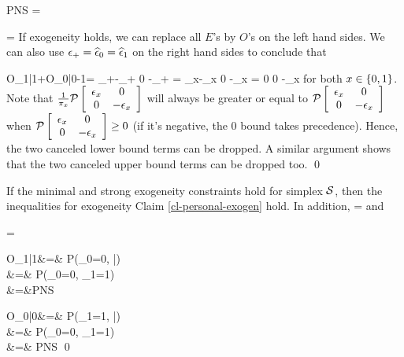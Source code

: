 \beq
PNS =
\eeq

\beq
\left[
\begin{array}{c}
E_{1|1}
\\
\\
E_{0|0}
\\
\\
O_{1,1}+ O_{0,0}
\\
\\
E_{1|1} + E_{0|0}
-O_{1,1}- O_{0,0}
\end{array}
\right]
=
\eeq
If exogeneity holds,
we can replace all $E$'s
by $O$'s on the left hand sides.
We can also use $\epsilon_+=\widehat{\epsilon}_0=
\widehat{\epsilon}_1$
on the right hand sides to conclude that

\beq
O_{1|1}+O_{0|0}-1=
\Pmat{\eps_+}
{\eps_+-\eps_+}
{0}
{-\eps_+}
=
{\HAT{\eps}_x-\HAT{\eps}_x}
{0}
{-\HAT{\eps}_x}
=
{0}
{0}
{-\eps_x}
\eeq
for both $x\in\{0,1\}$.
Note that
$\frac{1}{\pi_x}{\cal P}\left[ \begin{array}{cc}\epsilon_x&0\\0&-\epsilon_x \end{array}\right]$
will always be greater or equal to
${\cal P}\left[ \begin{array}{cc}\epsilon_x&0\\0&-\epsilon_x \end{array}\right]$
when ${\cal P}\left[ \begin{array}{cc}\epsilon_x&0\\0&-\epsilon_x \end{array}\right]\geq 0$ (if it's
negative, the 0 bound takes precedence). Hence,
the two canceled lower bound terms
can be dropped.
A similar argument shows that the
two canceled upper bound terms
can be dropped too.
\qed



\begin{claim}
If the minimal and
strong exogeneity constraints
 hold for simplex ${\cal S}$,
then the inequalities
for exogeneity Claim \ref{cl-personal-exogen}
hold.
In addition,
\beq
\PN =
\eeq
and

\beq
\PS =
\eeq
\end{claim}
\proof
\beqa
\PN *O_{1|1}&=&
P(\rvy_0=0, |)
\\
&=&
P(\rvy_0=0, \rvy_1=1)
\\
&=&PNS
\eeqa

\beqa
\PS *O_{0|0}&=&
P(\rvy_1=1, |)
\\
&=&
P(\rvy_0=0, \rvy_1=1)
\\
&=& PNS
\eeqa
\qed


